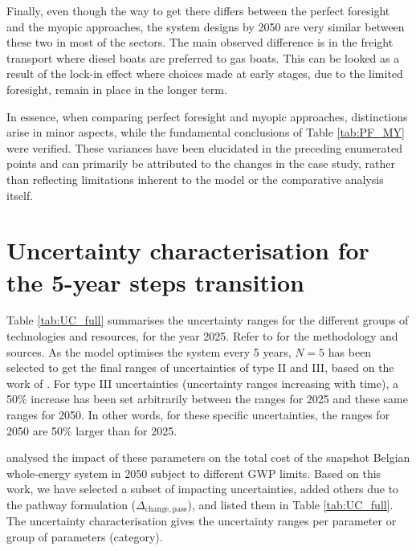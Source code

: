 Finally, even though the way to get there differs between the perfect foresight and the myopic approaches, the system designs by 2050 are very similar between these two in most of the sectors. The main observed difference is in the freight transport where diesel boats are preferred to gas boats. This can be looked as a result of the lock-in effect where choices made at early stages, due to the limited foresight, remain in place in the longer term. 

In essence, when comparing perfect foresight and myopic approaches, distinctions arise in minor aspects, while the fundamental conclusions of Table \ref{tab:PF_MY} were verified. These variances have been elucidated in the preceding enumerated points and can primarily be attributed to the changes in the case study, rather than reflecting limitations inherent to the model or the comparative analysis itself.



\section{Uncertainty characterisation for the 5-year steps transition} 
\label{app:UC_full}
Table \ref{tab:UC_full} summarises the uncertainty ranges for the different groups of technologies and resources, for the year 2025. Refer to \cite{Moret2017, Moret2017PhDThesis} for the methodology and sources. As the model optimises the system every 5 years, $N=5$ has been selected to get the final ranges of uncertainties of type II and III, based on the work of \citet{Moret2017PhDThesis}. For type III uncertainties (\ie uncertainty ranges increasing with time), a 50\% increase has been set arbitrarily between the ranges for 2025 and these same ranges for 2050. In other words, for these specific uncertainties, the ranges for 2050 are 50\% larger than for 2025.

\citet{rixhon2021role} analysed the impact of these parameters on the total cost of the snapshot Belgian whole-energy system in 2050 subject to different \gls{GWP} limits. Based on this work, we have selected a subset of impacting uncertainties, added others due to the pathway formulation (\eg $\Delta_{\mathrm{change,pass}}$), and listed them in Table \ref{tab:UC_full}. The uncertainty characterisation gives the uncertainty ranges per parameter or group of parameters (category).

